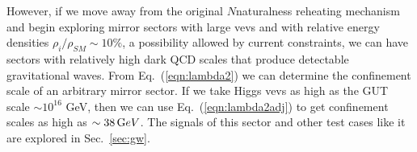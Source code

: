 \documentclass[nofootinbib,twocolumn,preprintnumbers]{revtex4-1}
\begin{document}
However, if we move away from the original $N$naturalness reheating mechanism and begin exploring mirror sectors with large vevs and with relative energy densities $\rho_i / \rho_{SM} \sim 10\%$, a possibility allowed by current constraints, we can have sectors with relatively high dark QCD scales that produce detectable gravitational waves. From Eq.~(\ref{eqn:lambda2}) we can determine the confinement scale of an arbitrary mirror sector. If we take Higgs vevs as high as the GUT scale $\sim 10^{16}$ GeV, then we can use Eq.~(\ref{eqn:lambda2adj}) to get confinement scales as high as $\sim 38 \,{\mathrm GeV}$.  The signals of this sector and other test cases like it are explored in Sec.~\ref{sec:gw}. 
\end{document}
